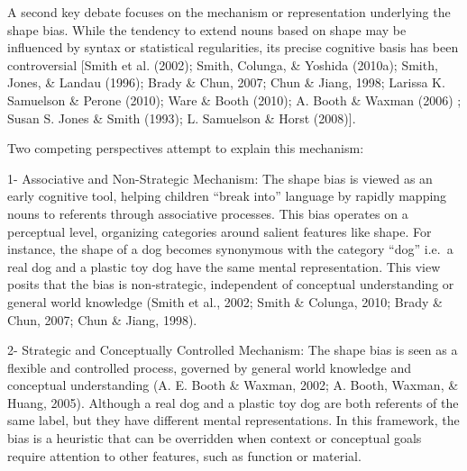 \documentclass[10pt, letterpaper]{article}
\begin{document}
A second key debate focuses on the mechanism or representation
underlying the shape bias. While the tendency to extend nouns based on
shape may be influenced by syntax or statistical regularities, its
precise cognitive basis has been controversial {[}Smith et al. (2002);
Smith, Colunga, \& Yoshida (2010a); Smith, Jones, \& Landau (1996);
Brady \& Chun, 2007; Chun \& Jiang, 1998; Larissa K. Samuelson \& Perone
(2010); Ware \& Booth (2010); A. Booth \& Waxman (2006) ; Susan S. Jones
\& Smith (1993); L. Samuelson \& Horst (2008){]}.

Two competing perspectives attempt to explain this mechanism:

1- Associative and Non-Strategic Mechanism: The shape bias is viewed as
an early cognitive tool, helping children ``break into'' language by
rapidly mapping nouns to referents through associative processes. This
bias operates on a perceptual level, organizing categories around
salient features like shape. For instance, the shape of a dog becomes
synonymous with the category ``dog'' i.e.~a real dog and a plastic toy
dog have the same mental representation. This view posits that the bias
is non-strategic, independent of conceptual understanding or general
world knowledge (Smith et al., 2002; Smith \& Colunga, 2010; Brady \&
Chun, 2007; Chun \& Jiang, 1998).

2- Strategic and Conceptually Controlled Mechanism: The shape bias is
seen as a flexible and controlled process, governed by general world
knowledge and conceptual understanding (A. E. Booth \& Waxman, 2002; A.
Booth, Waxman, \& Huang, 2005). Although a real dog and a plastic toy
dog are both referents of the same label, but they have different mental
representations. In this framework, the bias is a heuristic that can be
overridden when context or conceptual goals require attention to other
features, such as function or material.
\end{document}
